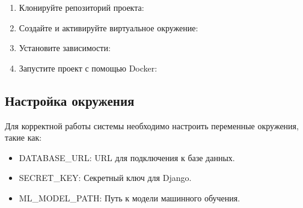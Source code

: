 \begin{enumerate}
\def\labelenumi{\arabic{enumi}.}
\item
  Клонируйте репозиторий проекта:

\begin{Shaded}
\begin{Highlighting}[]
\end{Highlighting}
\end{Shaded}
\item
  Создайте и активируйте виртуальное окружение:

\begin{Shaded}
\begin{Highlighting}[]
 
  
\end{Highlighting}
\end{Shaded}
\item
  Установите зависимости:

\begin{Shaded}
\begin{Highlighting}[]
\end{Highlighting}
\end{Shaded}
\item
  Запустите проект с помощью Docker:

\begin{Shaded}
\begin{Highlighting}[]
\end{Highlighting}
\end{Shaded}
\end{enumerate}

\hypertarget{ux43dux430ux441ux442ux440ux43eux439ux43aux430-ux43eux43aux440ux443ux436ux435ux43dux438ux44f}{%
\subsection*{Настройка
окружения}\label{ux43dux430ux441ux442ux440ux43eux439ux43aux430-ux43eux43aux440ux443ux436ux435ux43dux438ux44f}}

Для корректной работы системы необходимо настроить переменные окружения,
такие как: 
\begin{itemize}
    \item
DATABASE\_URL: URL для подключения к базе данных.
    \item
SECRET\_KEY: Секретный ключ для Django. 
    \item
ML\_MODEL\_PATH: Путь к модели машинного обучения.
\end{itemize}

